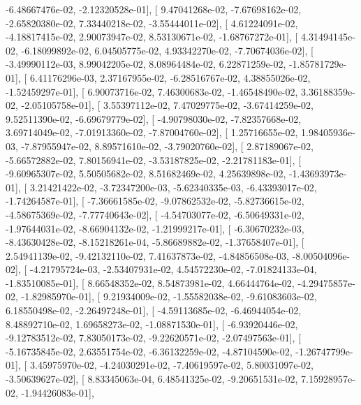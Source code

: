 \documentclass{article}
\begin{document}
         -6.48667476e-02,  -2.12320528e-01],
       [  9.47041268e-02,  -7.67698162e-02,  -2.65820380e-02,
          7.33440218e-02,  -3.55444011e-02],
       [  4.61224091e-02,  -4.18817415e-02,   2.90073947e-02,
          8.53130671e-02,  -1.68767272e-01],
       [  4.31494145e-02,  -6.18099892e-02,   6.04505775e-02,
          4.93342270e-02,  -7.70674036e-02],
       [ -3.49990112e-03,   8.99042205e-02,   8.08964484e-02,
          6.22871259e-02,  -1.85781729e-01],
       [  6.41176296e-03,   2.37167955e-02,  -6.28516767e-02,
          4.38855026e-02,  -1.52459297e-01],
       [  6.90073716e-02,   7.46300683e-02,  -1.46548490e-02,
          3.36188359e-02,  -2.05105758e-01],
       [  3.55397112e-02,   7.47029775e-02,  -3.67414259e-02,
          9.52511390e-02,  -6.69679779e-02],
       [ -4.90798030e-02,  -7.82357668e-02,   3.69714049e-02,
         -7.01913360e-02,  -7.87004760e-02],
       [  1.25716655e-02,   1.98405936e-03,  -7.87955947e-02,
          8.89571610e-02,  -3.79020760e-02],
       [  2.87189067e-02,  -5.66572882e-02,   7.80156941e-02,
         -3.53187825e-02,  -2.21781183e-01],
       [ -9.60965307e-02,   5.50505682e-02,   8.51682469e-02,
          4.25639898e-02,  -1.43693973e-01],
       [  3.21421422e-02,  -3.72347200e-03,  -5.62340335e-03,
         -6.43393017e-02,  -1.74264587e-01],
       [ -7.36661585e-02,  -9.07862532e-02,  -5.82736615e-02,
         -4.58675369e-02,  -7.77740643e-02],
       [ -4.54703077e-02,  -6.50649331e-02,  -1.97644031e-02,
         -8.66904132e-02,  -1.21999217e-01],
       [ -6.30670232e-03,  -8.43630428e-02,  -8.15218261e-04,
         -5.86689882e-02,  -1.37658407e-01],
       [  2.54941139e-02,  -9.42132110e-02,   7.41637873e-02,
         -4.84856508e-03,  -8.00504096e-02],
       [ -4.21795724e-03,  -2.53407931e-02,   4.54572230e-02,
         -7.01824133e-04,  -1.83510085e-01],
       [  8.66548352e-02,   8.54873981e-02,   4.66444764e-02,
         -4.29475857e-02,  -1.82985970e-01],
       [  9.21934009e-02,  -1.55582038e-02,  -9.61083603e-02,
          6.18550498e-02,  -2.26497248e-01],
       [ -4.59113685e-02,  -6.46944054e-02,   8.48892710e-02,
          1.69658273e-02,  -1.08871530e-01],
       [ -6.93920446e-02,  -9.12783512e-02,   7.83050173e-02,
         -9.22620571e-02,  -2.07497563e-01],
       [ -5.16735845e-02,   2.63551754e-02,  -6.36132259e-02,
         -4.87104590e-02,  -1.26747799e-01],
       [  3.45975970e-02,  -4.24030291e-02,  -7.40619597e-02,
          5.80031097e-02,  -3.50639627e-02],
       [  8.83345063e-04,   6.48541325e-02,  -9.20651531e-02,
          7.15928957e-02,  -1.94426083e-01],
\end{document}
